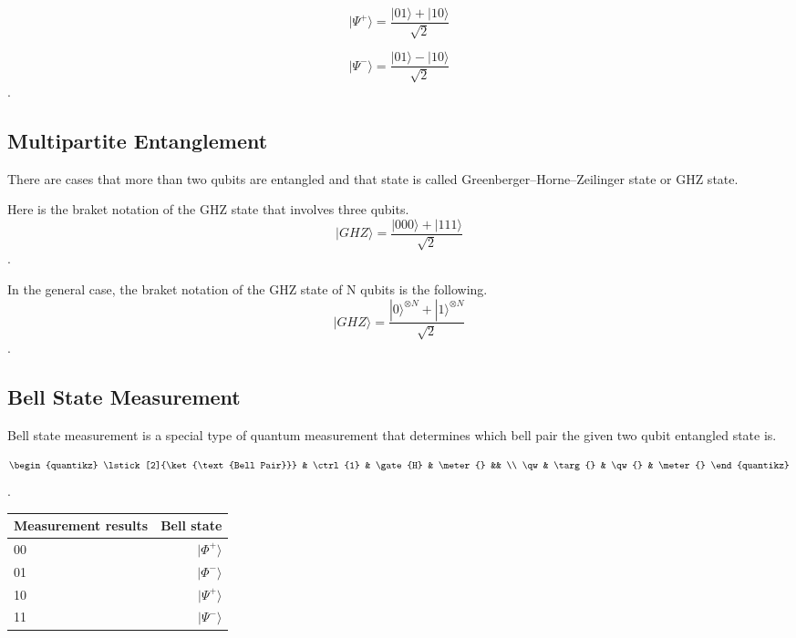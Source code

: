  \begin{equation}
 |\Psi^+\rangle = \frac{|01\rangle + |10\rangle}{\sqrt{2}}
 \end{equation}
 
 \begin{equation}
  |\Psi^-\rangle = \frac{|01\rangle - |10\rangle}{\sqrt{2}}
  \end{equation}.

\subsection{Multipartite Entanglement}
There are cases that more than two qubits are entangled and that state is called Greenberger–Horne–Zeilinger state or GHZ state.

Here is the braket notation of the GHZ state that involves three qubits.
\begin{equation}
  |GHZ\rangle = \frac{|000\rangle + |111\rangle}{\sqrt{2}}
\end{equation}.

In the general case, the braket notation of the GHZ state of N qubits is the following.
\begin{equation}
  |GHZ\rangle = \frac{|0\rangle^{\otimes N} + |1\rangle^{\otimes N}}{\sqrt{2}}
\end{equation}.

\subsection{Bell State Measurement}
Bell state measurement is a special type of quantum measurement that determines which bell pair the given two qubit entangled state is.

$$
\begin{quantikz}
  \lstick[2]{\ket{\text{Bell Pair}}}  & \ctrl{1} & \gate{H} & \meter{} && \\
  \qw & \targ{} & \qw{} & \meter{} 
\end{quantikz}
$$.

\begin{tabular}{|l|r|} \hline
  Measurement results & Bell state \\ \hline \cline{1-2}
  00 &  $|\Phi^+\rangle$ \\ \cline{1-2}
  01 & $|\Phi^-\rangle$ \\  \cline{1-2}
  10 &  $|\Psi^+\rangle$ \\ \cline{1-2}
  11 & $|\Psi^-\rangle$ \\  \hline  \cline{1-2}
\end{tabular}

